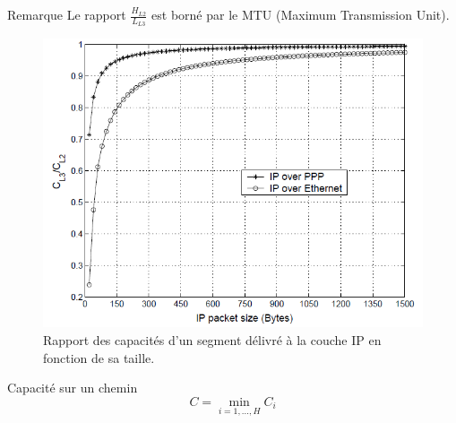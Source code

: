 \documentclass[compress]{beamer}
\begin{document}
\begin{frame}
	\begin{alertblock}{Remarque}
		Le rapport $\frac{H_{L2}}{L_{L3}}$ est borné par le MTU (Maximum Transmission Unit).
	\end{alertblock}
\begin{figure}[hbtp]
\centering
\includegraphics[scale=0.25]{schema1.PNG}
\caption{Rapport des capacités d'un segment délivré à la couche IP en fonction de sa taille.}
\end{figure}
		\begin{block}{Capacité sur un chemin}
		$$C = \min\limits_{i=1,...,H} C_{i}$$
		\end{block}
\end{frame}

\end{document}
